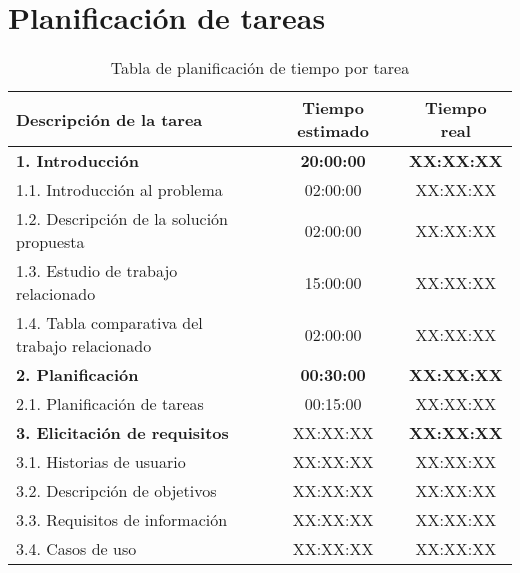 
\section{Planificación de tareas}\label{sec:planificacion-tareas}

\begin{table}[h]
	\centering
	\begin{tabular}{|l|c|c|}
	\hline
	\textbf{Descripción de la tarea} & \textbf{Tiempo estimado} & \textbf{Tiempo real} \\ \hline
		\textbf{1.	 Introducción}								& \textbf{20:00:00} & \textbf{XX:XX:XX} \\ \hline
		1.1. Introducción al problema 							& 		  02:00:00  & 		  XX:XX:XX  \\ \hline
		1.2. Descripción de la solución propuesta				& 		  02:00:00	& 		  XX:XX:XX  \\ \hline
		1.3. Estudio de trabajo relacionado						& 		  15:00:00	& 		  XX:XX:XX  \\ \hline
		1.4. Tabla comparativa del trabajo relacionado			& 		  02:00:00	& 		  XX:XX:XX  \\ \hline
		\textbf{2.	 Planificación}								& \textbf{00:30:00} & \textbf{XX:XX:XX} \\ \hline
		2.1. Planificación de tareas							& 		  00:15:00  & 		  XX:XX:XX  \\ \hline
		\textbf{3.	 Elicitación de requisitos}					&		 {XX:XX:XX} & \textbf{XX:XX:XX} \\ \hline
		3.1. Historias de usuario								& 		  XX:XX:XX  & 		  XX:XX:XX  \\ \hline
		3.2. Descripción de objetivos							& 		  XX:XX:XX  & 		  XX:XX:XX  \\ \hline
		3.3. Requisitos de información							& 		  XX:XX:XX  & 		  XX:XX:XX  \\ \hline
		3.4. Casos de uso										& 		  XX:XX:XX  & 		  XX:XX:XX  \\ \hline
		
	\end{tabular}
    \caption{Tabla de planificación de tiempo por tarea}
    \label{tabla:planificacion}
\end{table}